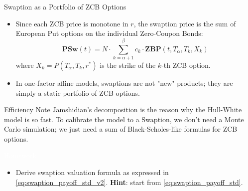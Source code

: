 \documentclass{beamer}
\begin{document}
\begin{frame}{Swaption as a Portfolio of ZCB Options }
	\begin{itemize}
		\item Since each ZCB price is monotone in $r$, the swaption price is the sum of European Put options on the individual Zero-Coupon Bonds:
		\begin{equation}
			\boxed{\textbf{PSw}(t) = N\cdot\sum_{k=\alpha+1}^\beta c_k\cdot \textbf{ZBP}(t, T_\alpha, T_k, X_k)}
		\end{equation}
		where $X_k = P(T_\alpha, T_k, r^*)$ is the strike of the $k$-th ZCB option.
		\item In one-factor affine models, swaptions are not "new" products; they are simply a \textcolor{maincolor}{static portfolio of ZCB options}.
	\end{itemize}
	\vfill
	\begin{block}{Efficiency Note}
		Jamshidian's decomposition is the reason why the Hull-White model is so fast. To calibrate the model to a Swaption, we don't need a Monte Carlo simulation; we just need a sum of Black-Scholes-like formulas for ZCB options.
	\end{block}
\end{frame}

\begin{homework}
	\begin{frame}{\textcolor{white}{Homework}}
		\begin{itemize}
			\item[white] Derive swaption valuation formula as expressed in \cref{eq:swaption_payoff_std_v2}. \textbf{Hint}: start from \cref{eq:swaption_payoff_std}.
		\end{itemize}
	\end{frame}
\end{homework}
\end{document}
